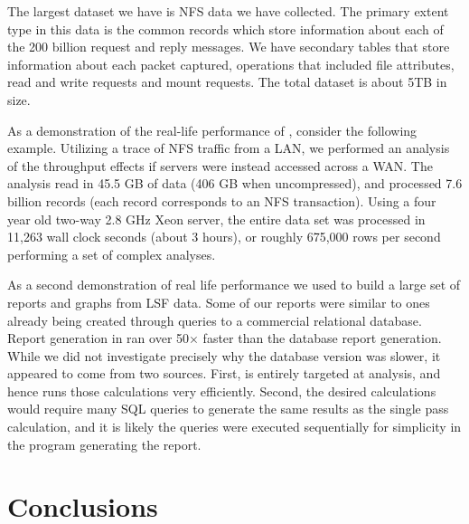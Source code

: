 \documentclass{acm_proc_article-sp}
\begin{document}
The largest dataset we have is NFS data we have collected.  The primary extent type 
in this data is the common records which store information about each
of the 200 billion request and reply messages. We have secondary tables that
store information about each packet captured, operations that included
file attributes, read and write requests and mount requests.  The total dataset
is about 5TB in size.

As a demonstration of the real-life performance of
\DataSeries{}, consider the following example.  Utilizing a trace of NFS
traffic from a LAN, we performed an analysis of the throughput
effects if servers were instead accessed across a WAN.
The analysis read in 45.5 GB of data (406 GB when uncompressed), and
processed 7.6 billion records (each record corresponds to an NFS
transaction).  Using a four year old two-way 2.8 GHz Xeon server, the
entire data set was processed in 11,263 wall clock seconds (about 3
hours), or roughly 675,000 rows per second performing a set of complex
analyses.

As a second demonstration of real life performance we used
\DataSeries{} to build a large set of reports and graphs from LSF
data.  Some of our reports were similar to ones already being created
through queries to a commercial relational database.  Report
generation in \DataSeries{} ran over 50$\times$ faster than the
database report generation.  While we did not investigate precisely
why the database version was slower, it appeared to come from two
sources.  First, \DataSeries{} is entirely targeted at analysis, and
hence runs those calculations very efficiently.  Second, the desired
calculations would require many SQL queries to generate the same
results as the single pass \DataSeries{} calculation, and it is likely
the queries were executed sequentially for simplicity in the program
generating the report.



\section{Conclusions}\label{sec:conclusions}
\end{document}
